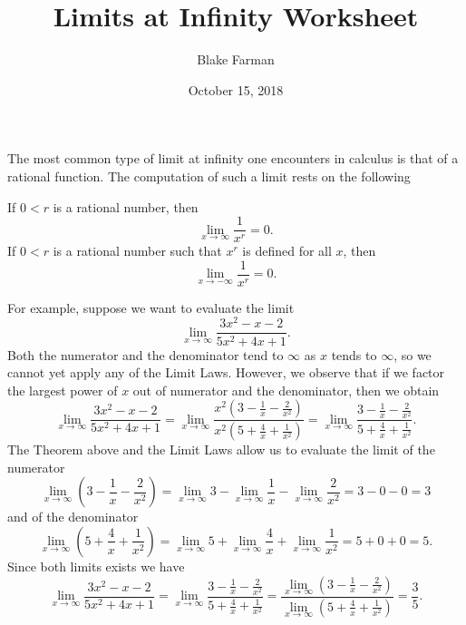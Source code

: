 \documentclass[10pt]{amsart}
\title[Limits at Infinity]{Limits at Infinity Worksheet}
\date{October 15, 2018}
\author{Blake Farman}
\begin{document}
\maketitle

\makenameslot

The most common type of limit at infinity one encounters in calculus is that of a rational function.
The computation of such a limit rests on the following
\begin{thm*}
  If \(0 < r\) is a rational number, then
  \[\lim_{x \to \infty} \frac{1}{x^r} = 0.\]
  If \(0 < r\) is a rational number such that \(x^r\) is defined for all \(x\), then
  \[\lim_{x \to -\infty} \frac{1}{x^r} = 0.\]
\end{thm*}


For example, suppose we want to evaluate the limit
\[\lim_{x \to \infty} \frac{3x^2 - x - 2}{5x^2 + 4x + 1}.\]
Both the numerator and the denominator tend to \(\infty\) as \(x\) tends to \(\infty\), so we cannot yet apply any of the Limit Laws.
However, we observe that if we factor the largest power of \(x\) out of numerator and the denominator, then we obtain
\[\lim_{x \to \infty} \frac{3x^2 - x - 2}{5x^2 + 4x + 1} = \lim_{x \to \infty} \frac{x^2(3 - \frac{1}{x} - \frac{2}{x^2})}{x^2(5 + \frac{4}{x} + \frac{1}{x^2})} = \lim_{x \to \infty} \frac{3 - \frac{1}{x} - \frac{2}{x^2}}{5 + \frac{4}{x} + \frac{1}{x^2}}.\]
The Theorem above and the Limit Laws allow us to evaluate the limit of the numerator
\[\lim_{x \to \infty} \left(3 - \frac{1}{x} - \frac{2}{x^2}\right) =
\lim_{x \to \infty}3 - \lim_{x \to \infty}\frac{1}{x} - \lim_{x \to \infty}\frac{2}{x^2} = 3 - 0 - 0 = 3\]
and of the denominator
\[\lim_{x \to \infty} \left(5 + \frac{4}{x} + \frac{1}{x^2}\right) =
\lim_{x \to \infty}5 + \lim_{x \to \infty}\frac{4}{x} + \lim_{x \to \infty}\frac{1}{x^2} = 5 + 0 + 0 = 5.\]
Since both limits exists we have
\[\lim_{x \to \infty} \frac{3x^2 - x - 2}{5x^2 + 4x + 1}
= \lim_{x \to \infty} \frac{3 - \frac{1}{x} - \frac{2}{x^2}}{5 + \frac{4}{x} + \frac{1}{x^2}}
= \frac{\lim_{x \to \infty} \left(3 - \frac{1}{x} - \frac{2}{x^2}\right)}{\lim_{x \to \infty} \left(5 + \frac{4}{x} + \frac{1}{x^2}\right)} = \frac{3}{5}.\]
\end{document}
